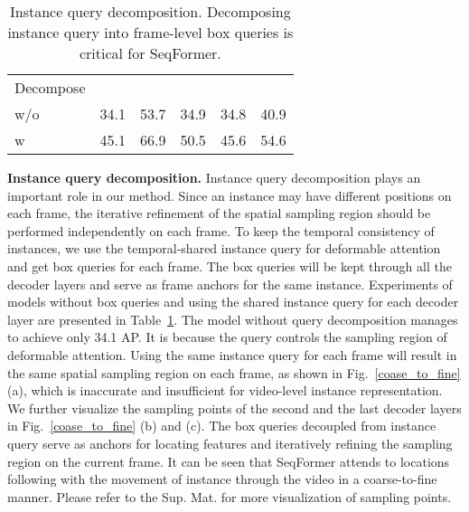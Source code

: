 \documentclass[runningheads]{llncs}
\begin{document}
\setlength{\tabcolsep}{4pt}
\begin{table}[tb]
\begin{center}
\caption{Instance query decomposition. Decomposing instance query into frame-level box queries is critical for SeqFormer.}
\label{query_decompose}
\begin{tabular}{lccccc}
\hline\noalign{\smallskip}
Decompose    &  &  & &  &  \\
\noalign{\smallskip}
\hline
\noalign{\smallskip}
w/o   &34.1  &53.7  &34.9  &34.8  &40.9\\
w     &45.1 &66.9 &50.5 &45.6 &54.6 \\
\hline
\end{tabular}
\end{center}
\end{table}
\setlength{\tabcolsep}{1.4pt}






\noindent\textbf{Instance query decomposition.}
Instance query decomposition plays an important role in our method. Since an instance may have different positions on each frame, the iterative refinement of the spatial sampling region should be performed independently on each frame. 
To keep the temporal consistency of instances, we use the temporal-shared instance query for deformable attention and get box queries for each frame. The box queries will be kept through all the decoder layers and serve as frame anchors for the same instance. Experiments of models without box queries and using the shared instance query for each decoder layer are presented in Table~\ref{query_decompose}. 
The model without query decomposition manages to achieve only 34.1 AP. 
It is because the query controls the sampling region of deformable attention. Using the same instance query for each frame will result in the same spatial sampling region on each frame, as shown in Fig.~\ref{coase_to_fine} (a), which is inaccurate and insufficient for video-level instance representation. We further visualize the sampling points of the second and the last decoder layers in Fig.~\ref{coase_to_fine} (b) and (c). The box queries decoupled from instance query serve as anchors for locating features and iteratively refining the sampling region on the current frame. It can be seen that SeqFormer attends to locations following with the movement of instance through the video in a coarse-to-fine manner. Please refer to the Sup. Mat. for more visualization of sampling points. 
\end{document}
